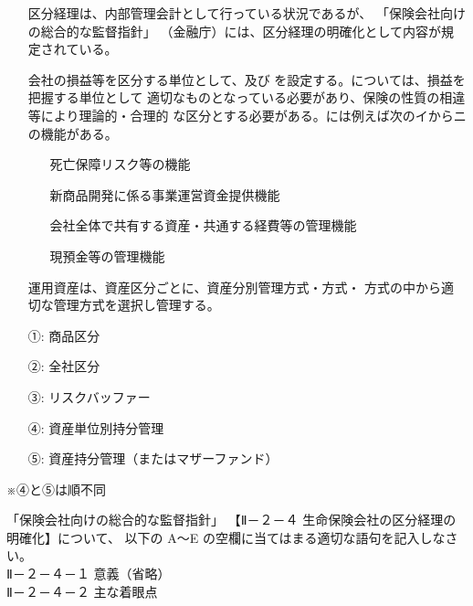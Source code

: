 \documentclass[report,gutter=10mm,fore-edge=10mm,uplatex,dvipdfmx]{jlreq}
\begin{document}
\begin{itemize}
 \item[] 区分経理は、内部管理会計として行っている状況であるが、
 「保険会社向けの総合的な監督指針」
 （金融庁）には、区分経理の明確化として内容が規定されている。
 \item[] 会社の損益等を区分する単位として、及び
 を設定する。については、損益を把握する単位として
 適切なものとなっている必要があり、保険の性質の相違等により理論的・合理的
 な区分とする必要がある。には例えば次のイからニの機能がある。
\begin{itemize}
\item[] 死亡保障リスク等の機能
\item[] 新商品開発に係る事業運営資金提供機能
\item[] 会社全体で共有する資産・共通する経費等の管理機能
\item[] 現預金等の管理機能
\end{itemize} 
\item[] 運用資産は、資産区分ごとに、資産分別管理方式・方式・
 方式の中から適切な管理方式を選択し管理する。
\end{itemize}

\answer{}
\begin{itemize}
\item[ ①: ] 商品区分
\item[ ②: ] 全社区分
\item[ ③: ] リスクバッファー
\item[ ④: ] 資産単位別持分管理
\item[ ⑤: ] 資産持分管理（またはマザーファンド）
\end{itemize}

※④と⑤は順不同

「保険会社向けの総合的な監督指針」
【Ⅱ－２－４ 生命保険会社の区分経理の明確化】について、
以下の A～E の空欄に当てはまる適切な語句を記入しなさい。\\
\vspace{1zh}
\noindent Ⅱ－２－４－１ 意義（省略）\\
Ⅱ－２－４－２ 主な着眼点
\end{document}
